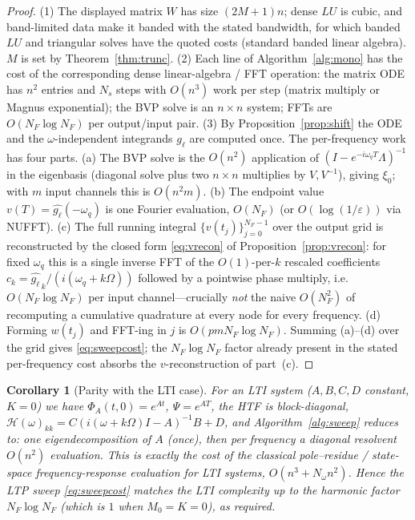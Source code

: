 \documentclass{amsart}
\newtheorem{corollary}{Corollary}
\theoremstyle{definition}
\newcommand{\Hcal}{\mathcal{H}}
\begin{document}
\begin{proof}
(1) The displayed matrix $W$ has size $(2M{+}1)n$; dense $LU$ is cubic, and
band-limited data make it banded with the stated bandwidth, for which banded
$LU$ and triangular solves have the quoted costs (standard banded linear
algebra). $M$ is set by Theorem~\ref{thm:trunc}. (2) Each line of
Algorithm~\ref{alg:mono} has the cost of the corresponding dense linear-algebra
/ FFT operation: the matrix ODE has $n^2$ entries and $N_s$ steps with $O(n^3)$
work per step (matrix multiply or Magnus exponential); the BVP solve is an
$n\times n$ system; FFTs are $O(N_F\log N_F)$ per output/input pair. (3) By
Proposition~\ref{prop:shift} the ODE and the $\omega$-independent integrands
$g_\ell$ are computed once. The per-frequency work has four parts.
(a) The BVP solve is the $O(n^2)$ application of
$(I-e^{-i\omega_q T}\Lambda)^{-1}$ in the eigenbasis (diagonal solve plus two
$n\times n$ multiplies by $V,V^{-1}$), giving $\xi_0$; with $m$ input channels
this is $O(n^2 m)$. (b) The endpoint value $v(T)=\widehat{g_\ell}(-\omega_q)$ is
one Fourier evaluation, $O(N_F)$ (or $O(\log(1/\varepsilon))$ via NUFFT).
(c) The full running integral $\{v(t_j)\}_{j=0}^{N_F-1}$ over the output grid is
reconstructed by the closed form \eqref{eq:vrecon} of
Proposition~\ref{prop:vrecon}: for fixed $\omega_q$ this is a single inverse FFT
of the $O(1)$-per-$k$ rescaled coefficients
$c_k=\widehat{g_\ell}_{\,k}/(i(\omega_q+k\Omega))$ followed by a pointwise phase
multiply, i.e. $O(N_F\log N_F)$ per input channel---crucially \emph{not} the
naive $O(N_F^2)$ of recomputing a cumulative quadrature at every node for every
frequency. (d) Forming $w(t_j)$ and FFT-ing in $j$ is $O(p m N_F\log N_F)$.
Summing (a)--(d) over the grid gives \eqref{eq:sweepcost}; the $N_F\log N_F$
factor already present in the stated per-frequency cost absorbs the
$v$-reconstruction of part~(c).
\end{proof}

\begin{corollary}[Parity with the LTI case]\label{cor:lti}
For an LTI system ($A,B,C,D$ constant, $K=0$) we have $\Phi_A(t,0)=e^{At}$,
$\Psi=e^{AT}$, the HTF is block-diagonal,
$\Hcal(\omega)_{kk}=C(i(\omega+k\Omega)I-A)^{-1}B+D$, and
Algorithm~\ref{alg:sweep} reduces to: one eigendecomposition of $A$ (once), then
per frequency a diagonal resolvent $O(n^2)$ evaluation. This is exactly the cost
of the classical pole–residue / state-space frequency-response evaluation for
LTI systems, $O(n^3+N_\omega n^2)$. Hence the LTP sweep \eqref{eq:sweepcost}
matches the LTI complexity up to the harmonic factor $N_F\log N_F$ (which is
$1$ when $M_0=K=0$), as required.
\end{corollary}
\end{document}
